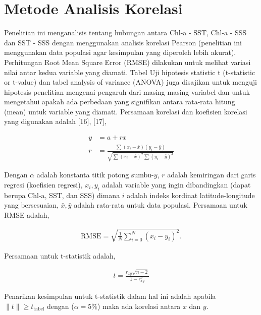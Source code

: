 \section[Metode Analisis Korelasi]{Metode Analisis Korelasi}
\begin{spacing}{1.5}
	Penelitian ini menganalisis tentang hubungan antara Chl-a - SST, Chl-a - SSS dan SST - SSS dengan menggunakan analisis korelasi Pearson (penelitian ini menggunakan data populasi agar kesimpulan yang diperoleh lebih akurat). Perhitungan Root Mean Square Error (RMSE) dilakukan untuk melihat variasi nilai antar kedua variable yang diamati. Tabel Uji hipotesis statistic t (t-statistic or t-value) dan tabel analysis of variance (ANOVA) juga disajikan untuk menguji hipotesis penelitian mengenai pengaruh dari masing-masing variabel dan untuk mengetahui apakah ada perbedaan yang signifikan antara rata-rata hitung (mean) untuk variable yang diamati. Persamaan korelasi dan koefisien korelasi yang digunakan adalah [16], [17],
	
	\begin{equation}
		\begin{aligned}
			y &= a+rx\\
			r &= \frac{\sum (x_i - \bar{x})(y_i - \bar{y})}{\sqrt{\sum (x_i-\bar{x})^2\sum (y_i-\bar{y})^2}}
		\end{aligned}
	\end{equation}

	Dengan $\alpha$ adalah konstanta titik potong sumbu-$y$, $r$ adalah kemiringan dari garis regresi (koefisien regresi), $x_i, y_i$ adalah variable yang ingin dibandingkan (dapat berupa Chl-a, SST, dan SSS) dimana $i$ adalah indeks kordinat latitude-longitude yang bersesuaian, $\bar{x},\bar{y}$ adalah rata-rata untuk data populasi. Persamaan untuk RMSE adalah,
	
	\begin{equation}
		\begin{aligned}
			\text{RMSE}=\sqrt{\frac{1}{N}\sum_{i=0}^{N}(x_i-y_i)^2}.
		\end{aligned}
	\end{equation}
	
	Persamaan untuk t-statistik adalah,
	
	\begin{equation}
		\begin{aligned}
			t=\frac{r_{xy}\sqrt{n-2}}{1-r^2_{xy}}
		\end{aligned}
	\end{equation}
	
	Penarikan kesimpulan untuk t-statistik dalam hal ini adalah apabila $\|t\|\geq t_{\text{tabel}}$ dengan ($\alpha=5\%$) maka ada korelasi antara $x$ dan $y$.
\end{spacing}
\vspace{-0.5pc}

